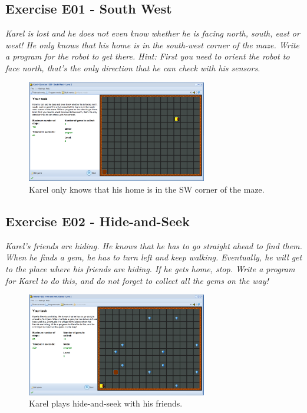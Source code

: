 \documentclass[article,A4,12pt]{llncs}
\begin{document}
\subsection{Exercise E01 - South West}

{\em Karel is lost and he does not even know whether he is facing north, south, east or west! He only knows that his home is in the south-west corner of the maze. Write a program for the robot to get there. Hint: First you need to orient the robot to face north, that's the only direction that he can check with his sensors.}


\begin{figure}[!ht]
\begin{center}
\includegraphics[width=0.7\textwidth]{img/e01.png}
\end{center}
\vspace{-4mm}
\caption{Karel only knows that his home is in the SW corner of the maze.}
\label{fig:e01}
\end{figure}
\noindent


\subsection{Exercise E02 - Hide-and-Seek}

{\em Karel's friends are hiding. He knows that he has to go straight 
ahead to find them. When he finds a gem, he has to turn left and keep 
walking. Eventually, he will get to the place where his friends are 
hiding. If he gets home, stop. Write a program for Karel to do this, 
and do not forget to collect all the gems on the way!}

\newpage

\begin{figure}[!ht]
\begin{center}
\includegraphics[width=0.7\textwidth]{img/e02.png}
\end{center}
\vspace{-4mm}
\caption{Karel plays hide-and-seek with his friends.}
\label{fig:e02}
\end{figure}
\noindent
\end{document}
